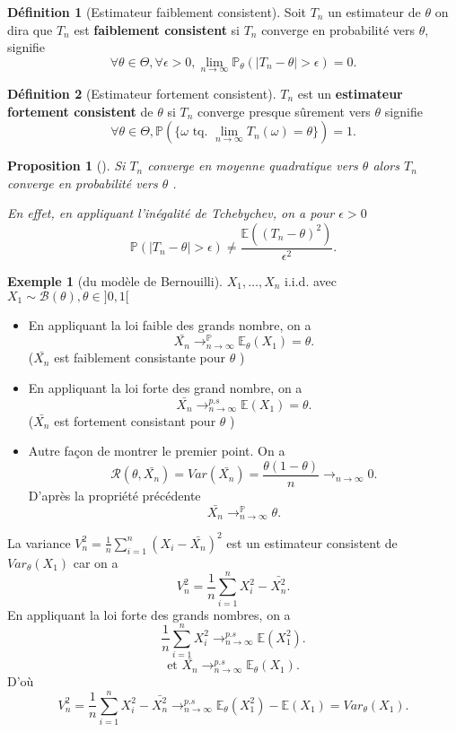 \documentclass{article}
\theoremstyle{plain}%
\newtheorem{prop}[thm]{Proposition}
\theoremstyle{definition}
\newtheorem{defn}{Définition}[section]
\newtheorem{exmp}{Exemple}[section]
\theoremstyle{remark}
\begin{document}
\begin{defn}[Estimateur faiblement consistent]
    Soit $ T_n $ un estimateur de $ \theta $ on dira que $ T_n $ est \textbf{faiblement consistent} si $ T_n $  converge en probabilité vers $ \theta  $, signifie 
    \[
        \forall \theta \in \Theta, \forall \epsilon > 0, \lim_{n \to \infty} \mathbb{P}_\theta (\left| T_n  - \theta  \right| > \epsilon ) = 0
    .\]
\end{defn}
\begin{defn}[Estimateur fortement consistent]
    $ T_n $ est un \textbf{estimateur fortement consistent} de $ \theta  $ si $ T_n $ converge presque sûrement vers $ \theta  $ signifie 
    \[
        \forall \theta \in \Theta, \mathbb{P}(\{\omega \text{ tq. }\lim_{n \to \infty} T_n(\omega ) = \theta \})=1
    .\]
\end{defn}
\begin{prop}[]
    Si $ T_n $ converge en moyenne quadratique vers $ \theta  $ alors $ T_n $  converge en probabilité vers $ \theta  $ . 

    En effet, en appliquant l'inégalité de Tchebychev, on a pour $ \epsilon > 0 $ 
    \[
        \mathbb{P}(\left| T_n -\theta  \right| > \epsilon ) \neq \frac{\mathbb{E}((T_n-\theta )^2)}{\epsilon ^2}
    .\]
\end{prop}
\begin{exmp}[du modèle de Bernouilli]
    $ X_1, \dots, X_n $ i.i.d. avec $ X_1 \sim \mathcal{B}(\theta ), \theta \in ]0,1[ $ \begin{itemize}
        \item En appliquant la loi faible des grands nombre, on a 
        \[
            \bar{X_n} \to ^\mathbb{P}_{n \to \infty } \mathbb{E}_\theta (X_1) = \theta 
        .\]
        ($ \bar{X_n} $ est faiblement consistante pour $ \theta  $ )
        
        \item En appliquant la loi forte des grand nombre, on a 
        \[
            \bar{X_n}\to ^{p.s}_{n \to \infty } \mathbb{E} (X_1) = \theta 
        .\]
        ($ \bar{X_n} $ est fortement consistant pour $ \theta  $  )
        
        \item Autre façon de montrer le premier point. On a 
        \[
            \mathcal{R}(\theta, \bar{X_n}) = Var(\bar{X_n}) = \frac{\theta (1-\theta )}{n} \to _{n \to \infty} 0 
        .\]
        D'après la propriété précédente 
        \[
            \bar{X_n} \to _{n \to \infty }^\mathbb{P} \theta 
        .\]
    \end{itemize}
    La variance $ V_n^2 = \frac{1}{n} \sum_{i=1}^{n}(X_i - \bar{X_n})^2 $ est un estimateur consistent de $ Var_\theta (X_1) $ car on a 
    \[
        V_n^2 = \frac{1}{n}\sum_{i=1}^{n}X_i^2 - \bar{X_n^2}
    .\]
    En appliquant la loi forte des grands nombres, on a 
    \[
        \frac{1}{n}\sum_{i=1}^{n}X_i^2 \to ^{p.s}_{n \to \infty } \mathbb{E}(X_1^2)
    .\]
    \[
        \text{et } \bar{X_n} \to ^{p.s}_{n \to \infty } \mathbb{E}_\theta (X_1)
    .\]
    D'où 
    \[
        V_n^2 = \frac{1}{n}\sum_{i=1}^{n}X_i^2 - \bar{X_n^2} \to ^{p.s}_{n \to \infty }\mathbb{E}_\theta (X_1^2) - \mathbb{E}(X_1) = Var_\theta (X_1)
    .\]
\end{exmp}
\end{document}

